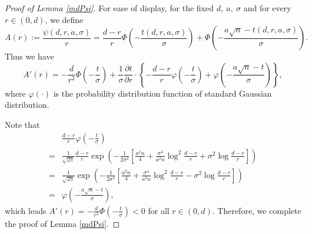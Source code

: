 \documentclass[12pt]{article}
\newtheorem{proof}{Proof}
\begin{document}
\begin{appendix}
\begin{proof}[Proof of Lemma \ref{mdPsi}]
For ease of display, for the fixed $d,~a,~\sigma$ and for every $r\in (0,d)$, we define
\begin{equation}
A(r) :=  \frac{\psi(d, r, a,\sigma)}{r}
= \frac{d-r}{r} {\Phi}\left( -\frac{ t(d, r, a, \sigma) }\sigma \right) 
    + {\Phi}\left( -\frac{ a\sqrt{n} - t(d, r, a, \sigma) }\sigma \right).
\end{equation}
Thus we have 
\begin{equation*}
A'(r) = -\frac{d}{r^2} {\Phi}\left( -\frac{ t }\sigma \right)
  +\frac1\sigma \frac{\partial t }{\partial r} \cdot
   \left\{ -\frac{d-r}{r} \varphi\left( -\frac{ t }\sigma \right)
    + \varphi\left( -\frac{ a\sqrt{n} - t }\sigma \right)  \right\},
\end{equation*}
where $\varphi(\cdot)$ is the probability distribution function of standard Gaussian distribution.

Note that
\begin{equation}\label{eq:equivalence}
\begin{aligned}
&\frac{d-r}{r} \varphi\left( -\frac{ t }\sigma \right)\\
=& \frac{1}{\sqrt{2\pi}}\frac{d-r}r \exp\left(-\frac1{2\sigma^2} \left[\frac{a^2 n}4
   + \frac{\sigma^4}{a^2 n} \log^2\frac{d-r}{r}+ \sigma^2 \log\frac{d-r}{r}\right] \right)\\
=& \frac{1}{\sqrt{2\pi}} \exp\left( -\frac{ 1 }{2 \sigma^2} \left[ \frac{a^2 n}4
   + \frac{\sigma^4}{a^2 n} \log^2\frac{d-r}{r} - \sigma^2 \log\frac{d-r}{r}\right]  \right)\\
=& \varphi\left( -\frac{ a\sqrt{n}- t }\sigma \right),
\end{aligned}
\end{equation}
which leads $A'(r) = -\frac{d}{r^2} {\Phi}\left( -\frac{t}\sigma \right) <0$ for all $ r\in (0,d)$. 
Therefore, we complete the proof of Lemma \ref{mdPsi}.
\end{proof}

\end{appendix}
\end{document}
